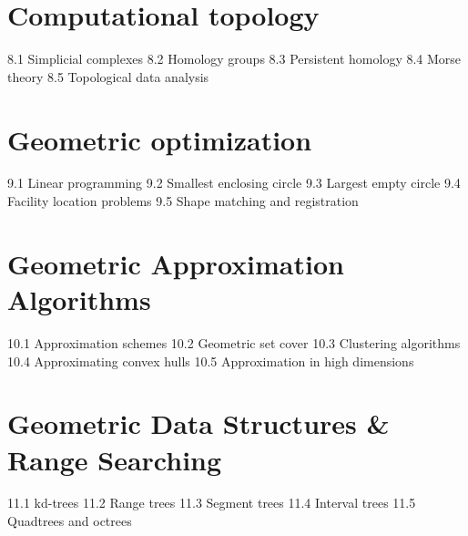 \section{Computational topology}
8.1 Simplicial complexes
8.2 Homology groups
8.3 Persistent homology
8.4 Morse theory
8.5 Topological data analysis
\section{Geometric optimization}
9.1 Linear programming
9.2 Smallest enclosing circle
9.3 Largest empty circle
9.4 Facility location problems
9.5 Shape matching and registration
\section{Geometric Approximation Algorithms}
10.1 Approximation schemes
10.2 Geometric set cover
10.3 Clustering algorithms
10.4 Approximating convex hulls
10.5 Approximation in high dimensions
\section{Geometric Data Structures \& Range Searching}
11.1 kd-trees
11.2 Range trees
11.3 Segment trees
11.4 Interval trees
11.5 Quadtrees and octrees
